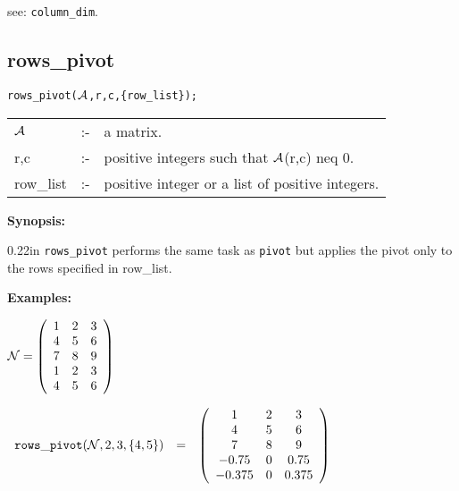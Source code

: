 \hspace{0.175in} see: {\tt column\_dim}.


\subsection{rows\_pivot}


\hspace*{0.175in} {\tt rows\_pivot(${\cal A}$,r,c,\{row\_list\});}

\hspace*{0.1in}  
\begin{tabular}{l l l} 
${\cal A}$ &:-& a matrix. \\
r,c        &:-& positive integers such that ${\cal A}$(r,c) neq 0.\\
row\_list  &:-& positive integer or a list of positive integers.
\end{tabular}

{\bf Synopsis:} %

\begin{addtolength}{\leftskip}{0.22in}
{\tt rows\_pivot} performs the same task as {\tt pivot} but applies 
the pivot only to the rows specified in row\_list.

\end{addtolength}

{\bf Examples:}

\begin{flushleft}
\hspace*{0.175in}
\begin{math}  
{\cal N} = \left( \begin{array}{ccc} 1 & 2 & 3 \\ 4 & 5 & 6 \\ 7 & 8 & 
9 \\1 & 2 & 3 \\ 4 & 5 & 6
\end{array} \right)
\end{math}  
\end{flushleft}

\begin{flushleft}  
\hspace*{0.1in}
\begin{math}  
\begin{array}{ccc}
{\tt rows\_pivot}({\cal N},2,3,\{4,5\}) & = & \left( \begin{array}
{c c c}1 & 2 & 3 \\ 4 & 5 & 6 \\ 7 & 8 & 9 \\ -0.75 & 0 & 0.75 \\ 
-0.375 & 0 & 0.375 
 \end{array} \right) 
\end{array}
\end{math}  
\end{flushleft}

